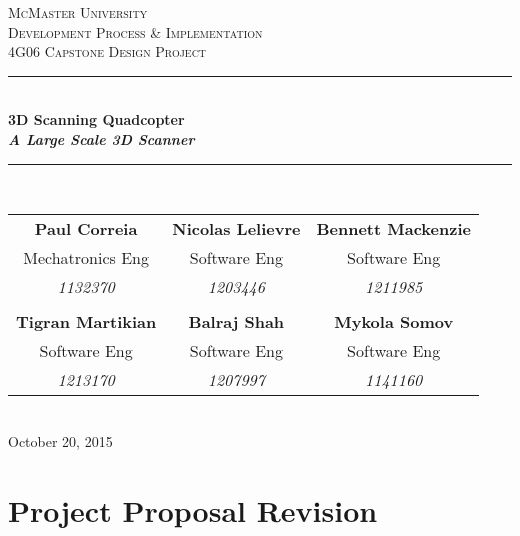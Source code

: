 \documentclass[10pt,letterpaper]{article}
\begin{document}
	
	
	\begin{titlepage}
		\newcommand{\HRule}{\rule{\linewidth}{0.5mm}}
		\center
		
		\textsc{\LARGE McMaster University}\\[1.5cm] %
		\textsc{\Large Development Process \& Implementation}\\[0.5cm] %
		\textsc{\large 4G06 Capstone Design Project}\\[0.5cm] %
		
		\HRule \\[0.4cm]
		{ \huge \bfseries 3D Scanning Quadcopter \\[2mm] \textit{A Large Scale 3D Scanner}}\\[0.4cm] %
		\HRule \\[1.5cm]
		
		\begin{tabular}{ccc}
			\bf{Paul Correia}		& \bf{Nicolas Lelievre} 	& \bf{Bennett Mackenzie}		\\
			Mechatronics Eng 		& Software Eng 				& Software Eng 					\\
			\textit{1132370} 		& \textit{1203446}			& \textit{1211985} 				\\ \\
			\bf{Tigran Martikian} 	& \bf{Balraj Shah} 			& \bf{Mykola Somov} 			\\
			Software Eng			& Software Eng				& Software Eng 					\\
			\textit{1213170} 		& \textit{1207997}			& \textit{1141160}
		\end{tabular}\\[4cm]
		
		{\large October 20, 2015}\\[3cm] 
		
		
		\vfill %
		
	\end{titlepage}
	
	
\tableofcontents

\newpage
	

\section{Project Proposal Revision}
\end{document}
